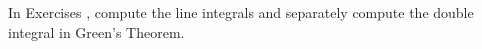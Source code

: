 {\noindent In Exercises} 
{,  compute the line integrals and separately compute the double integral in Green's Theorem.
}

